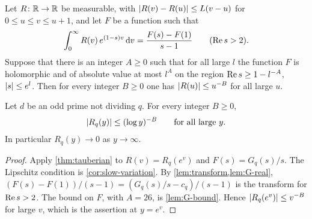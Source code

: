 \begin{theorem}\label{thm:tauberian}
Let $R\colon\mathbb{R}\to\mathbb{R}$ be measurable, with $\lvert R(v)-R(u)\rvert\le L(v-u)$ for $0\le u\le v\le u+1$, and
let $F$ be a function such that
\[
  \int_0^\infty R(v)\,e^{(1-s)v}\mathop{}\!\mathrm{d} v=\frac{F(s)-F(1)}{s-1}\qquad(\operatorname{Re} s>2).
\]
Suppose that there is an integer $A\ge0$ such that for all large $l$ the function $F$ is holomorphic and of absolute
value at most $l^A$ on the region $\operatorname{Re} s\ge1-l^{-A}$, $\lvert s\rvert\le e^l$. Then for every integer $B\ge0$ one has
$\lvert R(u)\rvert\le u^{-B}$ for all large $u$.
\end{theorem}

\begin{theorem}\label{thm:pnt-Rq}
Let $d$ be an odd prime not dividing $q$. For every integer $B\ge0$,
\[
  \lvert R_q(y)\rvert\le(\log y)^{-B}\qquad\text{for all large } y.
\]
In particular $R_q(y)\to0$ as $y\to\infty$.
\end{theorem}

\begin{proof}
Apply \cref{thm:tauberian} to $R(v)=R_q(e^v)$ and $F(s)=G_q(s)/s$. The Lipschitz condition is
\cref{cor:slow-variation}. By \cref{lem:transform,lem:G-real},
$(F(s)-F(1))/(s-1)=(G_q(s)/s-c_q)/(s-1)$ is the transform for $\operatorname{Re} s>2$. The bound on $F$, with
$A=26$, is \cref{lem:G-bound}. Hence $\lvert R_q(e^v)\rvert\le v^{-B}$ for large $v$, which is the
assertion at $y=e^v$.
\end{proof}

